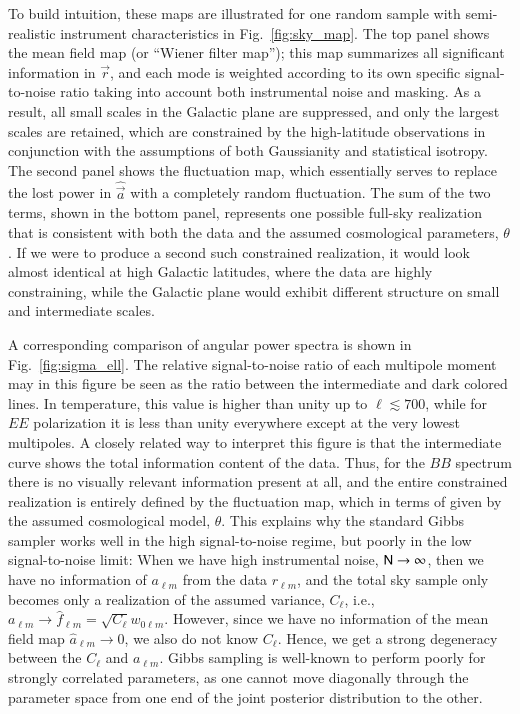 \documentclass[twocolumn]{../common/aa}
\renewcommand{\a}[0]{\vec{a}}
\newcommand{\N}[0]{\tens{N}}
\renewcommand{\r}[0]{\vec{r}}
\begin{document}
To build intuition, these maps are illustrated for one random sample with semi-realistic instrument characteristics in Fig.~\ref{fig:sky_map}. The top panel shows the mean field map (or ``Wiener filter map''); this map summarizes all significant information in $\r$, and each mode is weighted according to its own specific signal-to-noise ratio taking into account both instrumental noise and masking. As a result, all small scales in the Galactic plane are suppressed, and only the largest scales are retained, which are constrained by the high-latitude observations in conjunction with the assumptions of both Gaussianity and statistical isotropy. The second panel shows the fluctuation map, which essentially serves to replace the lost power in $\hat{\a}$ with a completely random fluctuation. The sum of the two terms, shown in the bottom panel, represents one possible full-sky realization that is consistent with both the data and the assumed cosmological parameters, $\theta$. If we were to produce a second such constrained realization, it would look almost identical at high Galactic latitudes, where the data are highly constraining, while the Galactic plane would exhibit different structure on small and intermediate scales.

A corresponding comparison of angular power spectra is shown in Fig.~\ref{fig:sigma_ell}. The relative signal-to-noise ratio of each multipole moment may in this figure be seen as the ratio between the intermediate and dark colored lines. In temperature, this value is higher than unity up to $\ell\lesssim700$, while for $EE$ polarization it is less than unity everywhere except at the very lowest multipoles. A closely related way to interpret this figure is that the intermediate curve shows the total information content of the data. Thus, for the $BB$ spectrum there is no visually relevant information present at all, and the entire constrained realization is entirely defined by the fluctuation map, which in terms of given by the assumed cosmological model, $\theta$. This explains why the standard Gibbs sampler works well in the high signal-to-noise regime, but poorly in the low signal-to-noise limit: When we have high instrumental noise, $\N \rightarrow \infty$, then we have no information of $a_{\ell m}$ from the data $r_{\ell m}$, and the total sky sample only becomes only a realization of the assumed variance, $C_{\ell}$, i.e., $a_{\ell m} \rightarrow \hat{f}_{\ell m} = \sqrt{C_{\ell}} w_{0\ell m}$. However, since we have no information of the mean field map $\hat{a}_{\ell m} \rightarrow 0$, we also do not know $C_\ell$. Hence, we get a strong degeneracy between the $C_\ell$ and $a_{\ell m}$. Gibbs sampling is well-known to perform poorly for strongly correlated parameters, as one cannot move diagonally through the parameter space from one end of the joint posterior distribution to the other. 
\end{document}

